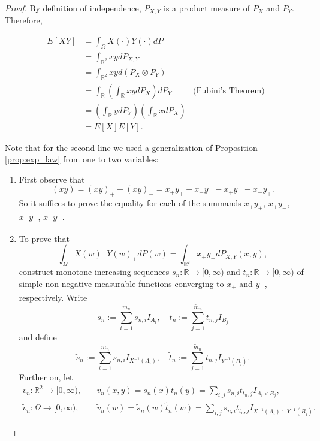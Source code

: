 \documentclass{book}
\theoremstyle{plain}%
\theoremstyle{definition}
\begin{document}
\begin{proof}
By definition of independence, $P_{X,Y}$ is a product measure of $P_X$ and $P_Y$. Therefore,

\begin{align*}
E[XY] &= \int_\Omega X(\cdot)Y(\cdot) dP  \\
&= \int_{\mathbb{R}^2} x y dP_{X,Y} \\
&= \int_{\mathbb{R}^2} x y d(P_X \otimes P_Y) \\
&= \int_\mathbb{R} \left(\int_\mathbb{R} xy dP_X \right) dP_Y & \text{(Fubini's Theorem)} \\
&= \left(\int_\mathbb{R} y dP_Y \right)  \left(\int_\mathbb{R} x dP_X \right) \\
&= E[X]E[Y].
\end{align*}

Note that for the second line we used a generalization of Proposition \ref{prop:exp_law} from one to two variables:
    \begin{enumerate}
    \item First observe that 
            $$(xy)=(xy)_+-(xy)_-=x_+y_++x_-y_--x_+y_--x_-y_+.$$
        So it suffices to prove the equality for each of the summands
        $x_+y_+$, $x_+y_-$, $x_-y_+$, $x_-y_-$.
    \item 
        To prove that 
            \begin{equation}
            \label{bivariate-integration}
            \int_{\Omega} X(w)_+Y(w)_+ dP(w)
            =
            \int_{\mathbb{R}^2} x_+y_+ dP_{X,Y}(x,y),
            \end{equation}
        construct monotone increasing sequences $s_n:\mathbb{R}\to [0,\infty)$ and $t_n:\mathbb{R}\to [0,\infty)$ of simple non-negative measurable functions converging to $x_+$
        and $y_+$, respectively. 
        Write
        $$s_n:=\sum_{i=1}^{m_n}s_{n,i} I_{A_i},\quad
        t_n:=\sum_{j=1}^{\tilde m_n}t_{n,j} I_{B_j}$$
        and
        define
        $$
        \tilde s_n:=\sum_{i=1}^{m_n}s_{n,i} I_{X^{-1}(A_i)},\quad
        \tilde t_n:=\sum_{j=1}^{\tilde m_n}t_{n,j} I_{Y^{-1}(B_j)}.
        $$
        Further on, let
        \begin{align*}
            v_n:\mathbb{R}^2\to [0,\infty),\quad  &v_n(x,y)=s_n(x)t_n(y)
            =\sum_{i,j}s_{n,i}t_{t_n,j}I_{A_i\times B_j}
            ,\\
            \tilde v_n:\Omega\to [0,\infty),\quad  
            &\tilde v_n(w)=\tilde s_n(w)\tilde t_n(w)
            =
            \sum_{i,j}s_{n,i}t_{t_n,j}I_{X^{-1}(A_i)\cap Y^{-1}(B_j)}.

\end{align*}
\end{enumerate}
\end{proof}
\end{document}

